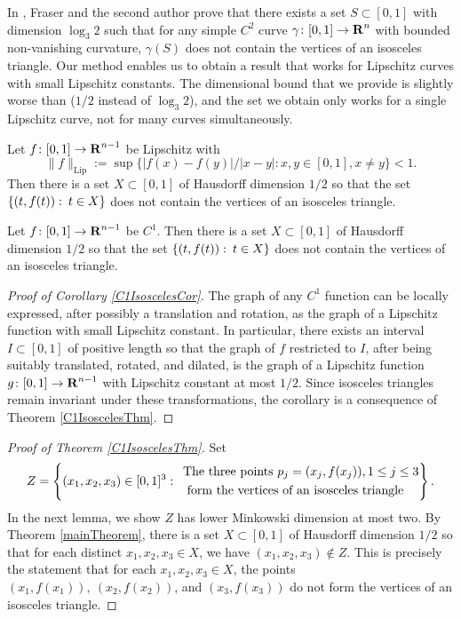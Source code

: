 In \cite{MalabikaRob}, Fraser and the second author prove that there exists a set $S \subset [0,1]$ with dimension $\log_3 2$ such that for any simple $C^2$ curve $\gamma \colon [0,1] \to \operatorname{\mathbf{R}}^n$ with bounded non-vanishing curvature, $\gamma(S)$ does not contain the vertices of an isosceles triangle. Our method enables us to obtain a result that works for Lipschitz curves with small Lipschitz constants. The dimensional bound that we provide is slightly worse than \cite{MalabikaRob} ($1/2$ instead of $\log_3 2$), and the set we obtain only works for a single Lipschitz curve, not for many curves simultaneously.

\begin{theorem}\label{C1IsoscelesThm}
	Let $f\colon [0,1] \to \operatorname{\mathbf{R}}^{n-1}$ be Lipschitz with \[ \| f \|_{\text{Lip}}  := \sup \bigl\{|f(x) - f(y)|/|x-y| : x, y \in [0,1], x \ne y   \bigr\} < 1. \]  Then there is a set $X \subset [0,1]$ of Hausdorff dimension $1/2$ so that the set $\{(t,f(t)) \operatorname{\colon} t\in X\}$ does not contain the vertices of an isosceles triangle.
\end{theorem}

\begin{corollary}
\label{C1IsoscelesCor}
Let $f\colon [0,1] \to \operatorname{\mathbf{R}}^{n-1}$ be $C^1$.  Then there is a set $X \subset [0,1]$ of Hausdorff dimension $1/2$ so that the set $\{(t,f(t)) \operatorname{\colon} t\in X\}$ does not contain the vertices of an isosceles triangle.
\end{corollary} 
\begin{proof}[Proof of Corollary \ref{C1IsoscelesCor}]
The graph of any $C^1$ function can be locally expressed, after possibly a translation and rotation, as the graph of a Lipschitz function with small Lipschitz constant. In particular, there exists an interval $I\subset[0,1]$ of positive length so that the graph of $f$ restricted to $I$, after being suitably translated, rotated, and dilated, is the graph of a Lipschitz function $g\colon [0,1] \to \operatorname{\mathbf{R}}^{n-1}$ with Lipschitz constant at most $1/2$. Since isosceles triangles remain invariant under these transformations, the corollary is a consequence of Theorem \ref{C1IsoscelesThm}.  
\end{proof} 

\begin{proof}[Proof of Theorem \ref{C1IsoscelesThm}]
	Set
	\begin{equation} \label{def-Z} Z = \left\{ (x_1,x_2,x_3) \in [0,1]^3 \operatorname{\colon} \; \begin{aligned} &{\text{The three points }} p_j = (x_j,f(x_j)), 1 \leq j \leq 3 \\  &\text{ form the vertices of an isosceles triangle} \end{aligned} \right\}. \end{equation} 
	In the next lemma, we show $Z$ has lower Minkowski dimension at most two. By Theorem \ref{mainTheorem}, there is a set $X \subset[0,1]$ of Hausdorff dimension $1/2$ so that for each distinct $x_1,x_2,x_3\in X$, we have $(x_1,x_2,x_3)\not\in Z$. This is precisely the statement that for each $x_1,x_2,x_3\in X$, the points $(x_1,f(x_1)),\ (x_2,f(x_2))$, and $(x_3,f(x_3))$ do not form the vertices of an isosceles triangle. 
\end{proof}

